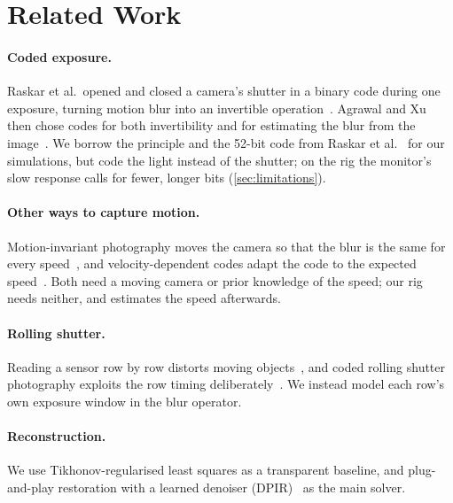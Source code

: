 \section{Related Work}
\label{sec:literature}

\paragraph{Coded exposure.}
Raskar et al.\ opened and closed a camera's shutter in a binary code during one exposure, turning
motion blur into an invertible operation~\cite{raskar2006coded}. Agrawal and Xu then chose codes
for both invertibility and for estimating the blur from the image~\cite{agrawal2009coded}. We borrow
the principle and the 52-bit code from Raskar et al.~\cite{raskar2006coded} for our simulations, but code the light instead of the
shutter; on the rig the monitor's slow response calls for fewer, longer bits (\cref{sec:limitations}). 

\paragraph{Other ways to capture motion.}
Motion-invariant photography moves the camera so that the blur is the same for every
speed~\cite{levin2008motion}, and velocity-dependent codes adapt the code to the expected
speed~\cite{mccloskey2010velocity}. Both need a moving camera or prior knowledge of the speed; our
rig needs neither, and estimates the speed afterwards.

\paragraph{Rolling shutter.}
Reading a sensor row by row distorts moving objects~\cite{liang2008rolling}, and coded rolling
shutter photography exploits the row timing deliberately~\cite{gu2010coded}. We instead model each
row's own exposure window in the blur operator.

\paragraph{Reconstruction.}
We use Tikhonov-regularised least squares as a transparent baseline, and plug-and-play restoration
with a learned denoiser (DPIR)~\cite{zhang2022plug} as the main solver.
